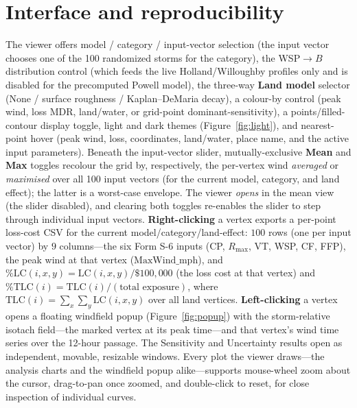 \documentclass[11pt]{article}
\begin{document}
\section{Interface and reproducibility}
The viewer offers model / category / input-vector selection (the input vector
chooses one of the 100 randomized storms for the category), the WSP$\to B$
distribution control (which feeds the live Holland/Willoughby profiles only and is
disabled for the precomputed Powell model), the three-way \textbf{Land model}
selector (None / surface roughness / Kaplan--DeMaria decay), a colour-by control
(peak wind, loss MDR, land/water, or grid-point dominant-sensitivity), a
points/filled-contour display toggle,
light and dark themes (Figure~\ref{fig:light}), and nearest-point hover (peak
wind, loss, coordinates, land/water, place name, and the active input
parameters). Beneath the input-vector slider, mutually-exclusive \textbf{Mean} and
\textbf{Max} toggles recolour the grid by, respectively, the per-vertex wind
\emph{averaged} or \emph{maximised} over all 100 input vectors (for the current
model, category, and land effect); the latter is a worst-case envelope. The viewer
\emph{opens} in the mean view (the slider disabled), and clearing both toggles
re-enables the slider to step through individual input vectors. \textbf{Right-clicking}
a vertex exports a per-point loss-cost CSV for the current model/category/land-effect:
$100$ rows (one per input vector) by $9$ columns---the six Form S-6 inputs (CP,
$R_{\max}$, VT, WSP, CF, FFP), the peak wind at that vertex ($\mathrm{MaxWind\_mph}$),
and $\%\mathrm{LC}(i,x,y)=\mathrm{LC}(i,x,y)/\$100{,}000$
(the loss cost at that vertex) and $\%\mathrm{TLC}(i)=\mathrm{TLC}(i)/(\text{total
exposure})$, where $\mathrm{TLC}(i)=\sum_x\sum_y \mathrm{LC}(i,x,y)$ over all land
vertices. \textbf{Left-clicking} a vertex opens a floating windfield popup
(Figure~\ref{fig:popup}) with the storm-relative isotach field---the marked
vertex at its peak time---and that vertex's wind time series over the 12-hour
passage. The Sensitivity and Uncertainty results open as independent, movable,
resizable windows. Every plot the viewer draws---the analysis charts and the
windfield popup alike---supports mouse-wheel zoom about the cursor, drag-to-pan
once zoomed, and double-click to reset, for close inspection of individual curves.
\end{document}
